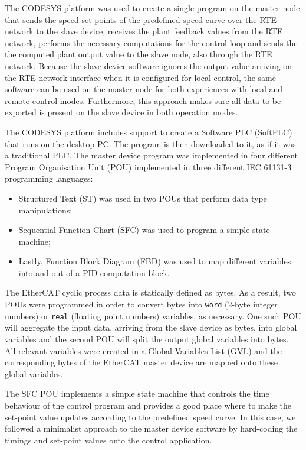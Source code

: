 The CODESYS platform was used to create a single program on the master node that sends the speed set-points of the predefined speed curve over the RTE network to the slave device, receives the plant feedback values from the RTE network, performs the necessary computations for the control loop and sends the the computed plant output value to the slave node, also through the RTE network.
Because the slave device software ignores the output value arriving on the RTE network interface when it is configured for local control, the same software can be used on the master node for both experiences with local and remote control modes.
Furthermore, this approach makes sure all data to be exported is present on the slave device in both operation modes.

The CODESYS platform includes support to create a Software PLC (SoftPLC) that runs on the desktop PC.
The program is then downloaded to it, as if it was a traditional PLC.
The master device program was implemented in four different Program Organisation Unit (POU) implemented in three different IEC 61131-3 programming languages: 
\begin{itemize}
	\item Structured Text (ST) was used in two POUs that perform data type manipulations;
	\item Sequential Function Chart (SFC) was used to program a simple state machine;
	\item Lastly, Function Block Diagram (FBD) was used to map different variables into and out of a PID computation block.
\end{itemize}

The EtherCAT cyclic process data is statically defined as bytes.
As a result, two POUs were programmed in order to convert bytes into \verb|word| (2-byte integer numbers) or \verb|real| (floating point numbers) variables, as necessary.
One such POU will aggregate the input data, arriving from the slave device as bytes, into global variables and the second POU will split the output global variables into bytes.
All relevant variables were created in a Global Variables List (GVL) and the corresponding bytes of the EtherCAT master device are mapped onto these global variables.

The SFC POU implements a simple state machine that controls the time behaviour of the control program and provides a good place where to make the set-point value updates according to the predefined speed curve.
In this case, we followed a minimalist approach to the master device software by hard-coding the timings and set-point values onto the control application.

